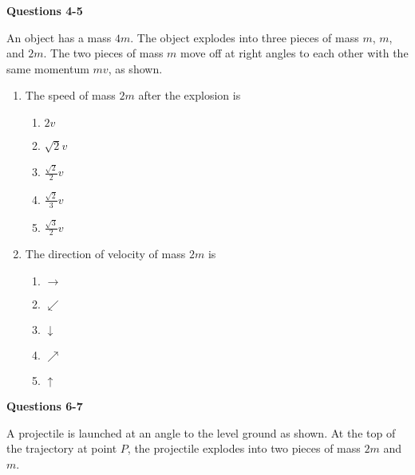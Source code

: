 \documentclass{../../oss-apphys}
\begin{document}
\begin{multicols}{2}
\begin{enumerate}[leftmargin=18pt]
  \end{enumerate}
  \columnbreak
  
  \textbf{Questions 4-5}

  An object has a mass $4m$. The object explodes into three pieces of mass $m$,
  $m$, and $2m$. The two pieces of mass $m$ move off at right angles to each
  other with the same momentum $mv$, as shown.
  \begin{center}
  \end{center}
  \begin{enumerate}[leftmargin=18pt,resume]
  \item The speed of mass $2m$ after the explosion is
    \begin{enumerate}[noitemsep,topsep=0pt,leftmargin=18pt,label=(\Alph*)]
    \item $2v$
    \item $\displaystyle\sqrt{2}v$
    \item $\displaystyle\frac{\sqrt{2}}{2}v$
    \item $\displaystyle\frac{\sqrt{2}}{3}v$
    \item $\displaystyle\frac{\sqrt{3}}{2}v$
    \end{enumerate}
    
  \item  The direction of velocity of mass $2m$ is
    \begin{enumerate}[noitemsep,topsep=0pt,leftmargin=18pt,label=(\Alph*)]
    \item $\rightarrow$
    \item $\swarrow$
    \item $\downarrow$
    \item $\nearrow$
    \item $\uparrow$
    \end{enumerate}
  \end{enumerate}

  \columnbreak
  \textbf{Questions 6-7}

  A projectile is launched at an angle to the level ground as shown. At the top
  of the trajectory at point $P$, the projectile explodes into two pieces of
  mass $2m$ and $m$.
  \begin{center}
  \end{center}


\end{multicols}
\end{document}
